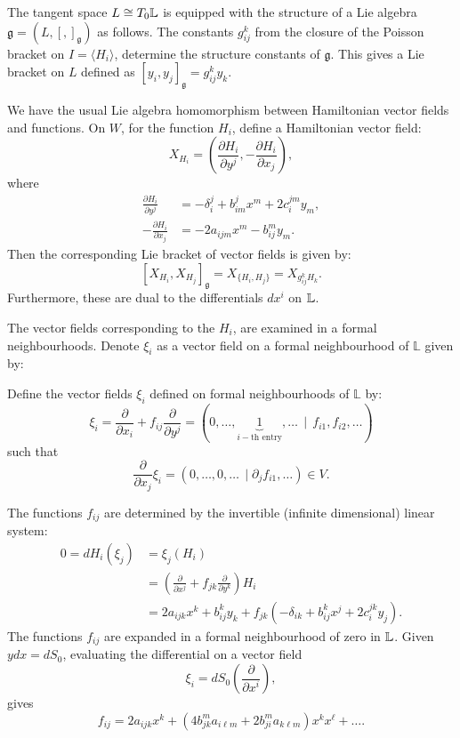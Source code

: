     The tangent space \( L \cong T_0\mathbb{L}\) is equipped with the structure of a Lie algebra \( \mathfrak{g} = (L, [, ]_{\mathfrak{g}}) \) as follows. The constants \(g_{ij}^k\) from the closure of the Poisson bracket on \(I = \langle H_i\rangle \), determine the structure constants of \( \mathfrak{g}\). This gives a Lie bracket on \( L\) defined as \( [y_i,y_j]_{\mathfrak{g}} =g_{ij}^k y_k\). 

    We have the usual Lie algebra homomorphism between Hamiltonian vector fields and functions. On \(W\), for the function \(H_i\), define a Hamiltonian vector field:
    \[ X_{H_i} = \left( \frac{\partial H_i}{\partial y^j}, - \frac{\partial H_i}{\partial x_j} \right), \]
    where 
    \begin{align*}
    \frac{\partial H_i}{\partial y^j} &= - \delta_{i}^j +  b_{im}^j x^m + 2 c_{i}^{j m} y_m, \\
    -\frac{\partial H_i}{\partial x_j} &= -2 a_{ijm}x^m -  b_{ij}^m y_m.
    \end{align*}
    Then the corresponding Lie bracket of vector fields is given by:
    \[ [X_{H_i}, X_{H_j} ]_{\mathfrak{g}} = X_{\{H_i,H_j\}} = X_{g_{ij}^k H_k}. \]
    Furthermore, these are dual to the differentials \(dx^i\) on \( \mathbb{L}\). 

    The vector fields corresponding to the \(H_i\), are examined in a formal neighbourhoods. Denote \( \xi_i\) as a vector field on a formal neighbourhood of \( \mathbb{L}\) given by:
    \begin{defn}
    \label{defn:vectfields} Define the vector fields \( \xi_i\) defined on formal neighbourhoods of \( \mathbb{L}\) by:
    \[ \xi_i=\frac{\partial}{\partial x_i}+ f_{ij}\frac{\partial}{\partial y^j}
    =(0,\dots,\underbrace{1}_{i-\text{th entry}},\dots \, \mid \, f_{i1},f_{i2}, \dots )\]
    such that 
    \[ \frac{\partial}{\partial x_j}\xi_i=(0,\dots,0,\dots\, \mid \partial_j f_{i1},\dots)\in V.\]
    \end{defn}
    The functions \( f_{ij}\) are determined by the invertible (infinite dimensional) linear system:
    \begin{align*}   
    0=dH_i(\xi_j)&=\xi_j(H_i)\\
    &=\left(\frac{\partial}{\partial x^j}+ f_{jk}\frac{\partial}{\partial y^k}\right)H_i\\
    &=2a_{ijk}x^k+b_{ij}^ky_k+ f_{jk}(-\delta_{ik}+ b_{ij}^kx^j+2c_i^{jk}y_j).
    \end{align*}
    The functions \(f_{ij}\) are expanded in a formal neighbourhood of zero in \(  \mathbb{L}\). Given \(y dx = d S_0\), evaluating the differential on a vector field
    \[\xi_i=dS_0\left(\frac{\partial}{\partial x^i}\right),\]
    gives
    \[f_{ij}=2a_{ijk}x^k+(4b_{jk}^ma_{i\ell m}+2b_{ji}^ma_{k\ell m})x^kx^\ell+ \dots. \]
    

